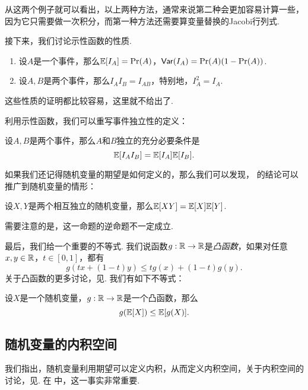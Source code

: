 从这两个例子就可以看出，以上两种方法，通常来说第二种会更加容易计算一些，因为它只需要做一次积分，而第一种方法还需要算变量替换的Jacobi行列式. 

接下来，我们讨论示性函数的性质. 

\begin{proposition}\label{prop:expectation-indicator}
\begin{enumerate}
    \item 设$A$是一个事件，那么$\mathbb{E}[I_A]=\Pr(A)$，$\mathsf{Var}(I_A)=\Pr(A)(1-\Pr(A))$.
    \item 设$A,B$是两个事件，那么$I_AI_B=I_{AB}$，特别地，$I_A^2=I_A$.
\end{enumerate}
\end{proposition}
这些性质的证明都比较容易，这里就不给出了. 

利用示性函数，我们可以重写事件独立性的定义：

\begin{proposition}\label{prop:independent-expectation}
设$A,B$是两个事件，那么$A$和$B$独立的充分必要条件是
\[\mathbb{E}[I_AI_B]=\mathbb{E}[I_A]\mathbb{E}[I_B].\]
\end{proposition}

如果我们还记得随机变量的期望是如何定义的，那么我们可以发现， 的结论可以推广到随机变量的情形：

\begin{proposition}\label{prop:independent-expectation-2}
设$X,Y$是两个相互独立的随机变量，那么$\mathbb{E}[XY]=\mathbb{E}[X]\mathbb{E}[Y]$. 
\end{proposition}

需要注意的是，这一命题的逆命题不一定成立. 

最后，我们给一个重要的不等式. 我们说函数$g:\mathbb{R}\to\mathbb{R}$是\emph{凸函数}，如果对任意$x,y\in\mathbb{R}$，$t\in[0,1]$，都有
\[g(tx+(1-t)y)\leq tg(x)+(1-t)g(y).\]
关于凸函数的更多讨论，见. 我们有如下不等式：

\begin{proposition}[Jensen不等式]\label{prop:jensen}
设$X$是一个随机变量，$g:\mathbb{R}\to\mathbb{R}$是一个凸函数，那么
\[g(\mathbb{E}[X])\leq \mathbb{E}[g(X)].\]
\end{proposition}

\subsection{随机变量的内积空间}\label{subsec:inner-product}

我们指出，随机变量利用期望可以定义内积，从而定义内积空间，关于内积空间的讨论，见. 在 中，这一事实非常重要. 

